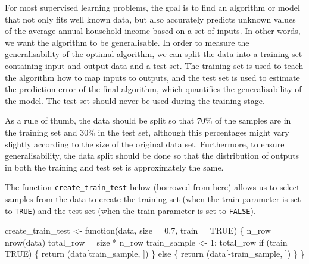 \documentclass[
  letterpaper,
  DIV=11,
  numbers=noendperiod]{scrreprt}
\newenvironment{Shaded}{\begin{snugshade}}{\end{snugshade}}
\newcommand{\AttributeTok}[1]{\textcolor[rgb]{0.40,0.45,0.13}{#1}}
\newcommand{\ConstantTok}[1]{\textcolor[rgb]{0.56,0.35,0.01}{#1}}
\newcommand{\ControlFlowTok}[1]{\textcolor[rgb]{0.00,0.23,0.31}{#1}}
\newcommand{\DecValTok}[1]{\textcolor[rgb]{0.68,0.00,0.00}{#1}}
\newcommand{\FloatTok}[1]{\textcolor[rgb]{0.68,0.00,0.00}{#1}}
\newcommand{\FunctionTok}[1]{\textcolor[rgb]{0.28,0.35,0.67}{#1}}
\newcommand{\NormalTok}[1]{\textcolor[rgb]{0.00,0.23,0.31}{#1}}
\newcommand{\OtherTok}[1]{\textcolor[rgb]{0.00,0.23,0.31}{#1}}
\newcommand{\SpecialCharTok}[1]{\textcolor[rgb]{0.37,0.37,0.37}{#1}}
\begin{document}
For most supervised learning problems, the goal is to find an algorithm
or model that not only fits well known data, but also accurately
predicts unknown values of the average annual household income based on
a set of inputs. In other words, we want the algorithm to be
generalisable. In order to measure the generalisability of the optimal
algorithm, we can split the data into a training set containing input
and output data and a test set. The training set is used to teach the
algorithm how to map inputs to outputs, and the test set is used to
estimate the prediction error of the final algorithm, which quantifies
the generalisability of the model. The test set should never be used
during the training stage.

As a rule of thumb, the data should be split so that 70\% of the samples
are in the training set and 30\% in the test set, although this
percentages might vary slightly according to the size of the original
data set. Furthermore, to ensure generalisability, the data split should
be done so that the distribution of outputs in both the training and
test set is approximately the same.

The function \texttt{create\_train\_test} below (borrowed from
\href{https://www.guru99.com/r-decision-trees.html}{here}) allows us to
select samples from the data to create the training set (when the train
parameter is set to \texttt{TRUE}) and the test set (when the train
parameter is set to \texttt{FALSE}).

\begin{Shaded}
\begin{Highlighting}[]
\NormalTok{create\_train\_test }\OtherTok{\textless{}{-}} \ControlFlowTok{function}\NormalTok{(data, }\AttributeTok{size =} \FloatTok{0.7}\NormalTok{, }\AttributeTok{train =} \ConstantTok{TRUE}\NormalTok{) \{}
\NormalTok{ n\_row }\OtherTok{=} \FunctionTok{nrow}\NormalTok{(data)}
\NormalTok{ total\_row }\OtherTok{=}\NormalTok{ size }\SpecialCharTok{*}\NormalTok{ n\_row}
\NormalTok{ train\_sample }\OtherTok{\textless{}{-}} \DecValTok{1}\SpecialCharTok{:}\NormalTok{ total\_row}
 \ControlFlowTok{if}\NormalTok{ (train }\SpecialCharTok{==} \ConstantTok{TRUE}\NormalTok{) \{}
 \FunctionTok{return}\NormalTok{ (data[train\_sample, ])}
\NormalTok{ \} }\ControlFlowTok{else}\NormalTok{ \{}
 \FunctionTok{return}\NormalTok{ (data[}\SpecialCharTok{{-}}\NormalTok{train\_sample, ])}
\NormalTok{ \}}
\NormalTok{\}}
\end{Highlighting}
\end{Shaded}
\end{document}

